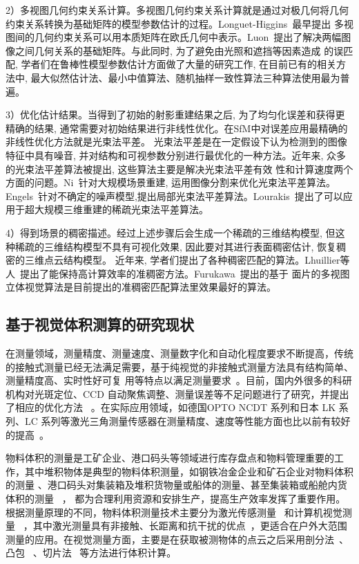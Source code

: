 2）多视图几何约束关系计算。多视图几何约束关系计算就是通过对极几何将几何约束关系转换为基础矩阵的模型参数估计的过程。Longuet-Higgins~\cite{longuet1981computer}最早提出
多视图间的几何约束关系可以用本质矩阵在欧氏几何中表示。Luon~\cite{luong1992matrice}提出了解决两幅图像之间几何关系的基础矩阵。与此同时, 为了避免由光照和遮挡等因素造成
的误匹配, 学者们在鲁棒性模型参数估计方面做了大量的研究工作, 在目前已有的相关方法中, 最大似然估计法、最小中值算法、随机抽样一致性算法三种算法使用最为普遍。

3）优化估计结果。当得到了初始的射影重建结果之后, 为了均匀化误差和获得更精确的结果, 通常需要对初始结果进行非线性优化。在SfM中对误差应用最精确的非线性优化方法就是光束法平差。
光束法平差是在一定假设下认为检测到的图像特征中具有噪音, 并对结构和可视参数分别进行最优化的一种方法。近年来, 众多的光束法平差算法被提出, 这些算法主要是解决光束法平差有效
性和计算速度两个方面的问题。Ni~\cite{ni2007out}针对大规模场景重建, 运用图像分割来优化光束法平差算法。
Engels~\cite{engels2006bundle}针对不确定的噪声模型,提出局部光束法平差算法。Lourakis~\cite{lourakis2009sba}提出了可以应用于超大规模三维重建的稀疏光束法平差算法。

4）得到场景的稠密描述。经过上述步骤后会生成一个稀疏的三维结构模型, 但这种稀疏的三维结构模型不具有可视化效果, 因此要对其进行表面稠密估计, 恢复稠密的三维点云结构模型。
近年来, 学者们提出了各种稠密匹配的算法。Lhuillier等人~\cite{lhuillier2005quasi}提出了能保持高计算效率的准稠密方法。Furukawa~\cite{furukawa2009accurate}提出的基于
面片的多视图立体视觉算法是目前提出的准稠密匹配算法里效果最好的算法。

\subsection{基于视觉体积测算的研究现状}
\label{sec:1.2.3}
在测量领域，测量精度、测量速度、测量数字化和自动化程度要求不断提高，传统的接触式测量已经无法满足需要，基于纯视觉的非接触式测量方法具有结构简单、测量精度高、实时性好可复
用等特点以满足测量要求~\cite{chang2011parkinson}。目前，国内外很多的科研机构对光斑定位、CCD 自动聚焦调整、测量误差等不足问题进行了研究，并提出了相应的优化方法
~\cite{chang2011parkinson}。在实际应用领域，如德国OPTO NCDT 系列和日本 LK 系列、LC 系列等激光三角测量传感器在测量精度、速度等性能方面也比以前有较好的提高~\cite{cigada2010laser}。

物料体积的测量是工矿企业、港口码头等领域进行库存盘点和物料管理重要的工作，其中堆积物体是典型的物料体积测量，如钢铁冶金企业和矿石企业对物料体积的测量
\cite{wang2013research} 、港口码头对集装箱及堆积货物量\cite{chang2010bulk}或船体\cite{yuntao2014bias}的测量、甚至集装箱或船舱内货体积的测量~\cite{shi2014study} ，
都为合理利用资源和安排生产，提高生产效率发挥了重要作用。根据测量原理的不同，物料体积测量技术主要分为激光传感测量~\cite{ren2013research} 和计算机视觉测量
~\cite{dong2015study,liu2009distance}，其中激光测量具有非接触、长距离和抗干扰的优点~\cite{rosen2012variation,meili2015design,shi2013study}，更适合在户外大范围
测量的应用。在视觉测量方面，主要是在获取被测物体的点云之后采用剖分法~\cite{Guo2014Resolution,zhang2010remote}、凸包~\cite{bi2013canopy} 、切片法~\cite{shi2014study}
等方法进行体积计算。 

